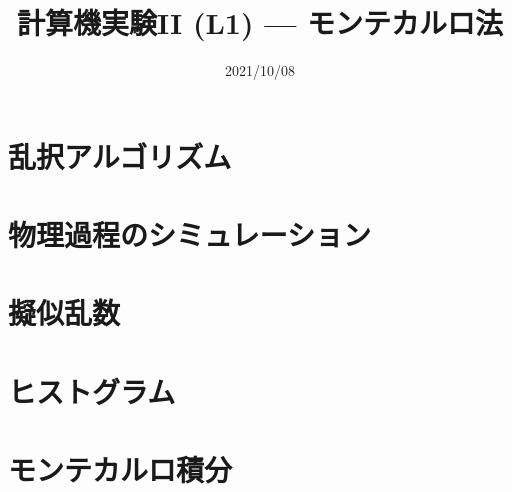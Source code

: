 \documentclass[10pt,dvipdfmx]{beamer}
\title{計算機実験II (L1) --- モンテカルロ法}
\date{2021/10/08}
\begin{document}
\begin{frame}
  \titlepage
  \tableofcontents
\end{frame}


% 

\section{乱択アルゴリズム}






\section{物理過程のシミュレーション}




\section{擬似乱数}







\section{ヒストグラム}



\section{モンテカルロ積分}











\end{document}
